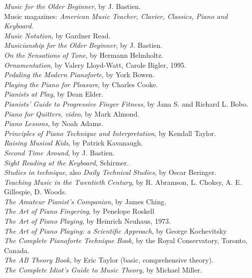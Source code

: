 \textit{Music for the Older Beginner}, by J. Bastien.\\
Music magazines: \textit{American Music Teacher, Clavier, Classics, Piano and Keyboard}.\\
\textit{Music Notation}, by Gardner Read.\\
\textit{Musicianship for the Older Beginner}, by J. Bastien.\\
\textit{On the Sensations of Tone}, by Hermann Helmholtz.\\
\textit{Ornamentation}, by Valery Lloyd-Watt, Carole Bigler, 1995.\\
\textit{Pedaling the Modern Pianoforte}, by York Bowen.\\
\textit{Playing the Piano for Pleasure}, by Charles Cooke.\\
\textit{Pianists at Play}, by Dean Elder.\\
\textit{Pianists' Guide to Progressive Finger Fitness}, by Jana S. and Richard L. Bobo.\\
\textit{Piano for Quitters, video}, by Mark Almond.\\
\textit{Piano Lessons}, by Noah Adams.\\
\textit{Principles of Piano Technique and Interpretation}, by Kendall Taylor.\\
\textit{Raising Musical Kids}, by Patrick Kavanaugh.\\
\textit{Second Time Around}, by J. Bastien.\\
\textit{Sight Reading at the Keyboard}, Schirmer.\\
\textit{Studies in technique}, also \textit{Daily Technical Studies}, by Oscar Beringer.\\
\textit{Teaching Music in the Twentieth Century}, by R. Abramson, L. Choksy, A. E. Gillespie, D. Woods.\\
\textit{The Amateur Pianist’s Companion}, by James Ching.\\
\textit{The Art of Piano Fingering}, by Penelope Roskell\\
\textit{The Art of Piano Playing}, by Heinrich Neuhaus, 1973.\\
\textit{The Art of Piano Playing: a Scientific Approach}, by George Kochevitsky\\
\textit{The Complete Pianoforte Technique Book}, by the Royal Conservatory, Toronto, Canada.\\
\textit{The AB Theory Book}, by Eric Taylor (basic, comprehensive theory).\\
\textit{The Complete Idiot’s Guide to Music Theory}, by Michael Miller.\\
